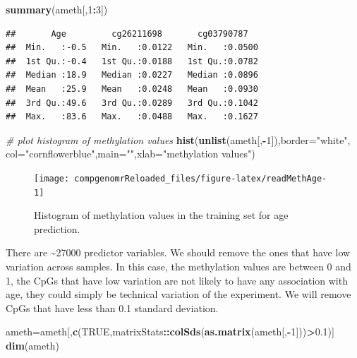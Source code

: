 \documentclass[12pt,]{krantz}
\newenvironment{Shaded}{\begin{snugshade}}{\end{snugshade}}
\newcommand{\CommentTok}[1]{\textcolor[rgb]{0.56,0.35,0.01}{\textit{#1}}}
\newcommand{\DataTypeTok}[1]{\textcolor[rgb]{0.13,0.29,0.53}{#1}}
\newcommand{\DecValTok}[1]{\textcolor[rgb]{0.00,0.00,0.81}{#1}}
\newcommand{\FloatTok}[1]{\textcolor[rgb]{0.00,0.00,0.81}{#1}}
\newcommand{\KeywordTok}[1]{\textcolor[rgb]{0.13,0.29,0.53}{\textbf{#1}}}
\newcommand{\NormalTok}[1]{#1}
\newcommand{\OperatorTok}[1]{\textcolor[rgb]{0.81,0.36,0.00}{\textbf{#1}}}
\newcommand{\OtherTok}[1]{\textcolor[rgb]{0.56,0.35,0.01}{#1}}
\newcommand{\StringTok}[1]{\textcolor[rgb]{0.31,0.60,0.02}{#1}}
\begin{document}
\begin{Shaded}
\begin{Highlighting}[]
\KeywordTok{summary}\NormalTok{(ameth[,}\DecValTok{1}\OperatorTok{:}\DecValTok{3}\NormalTok{])}
\end{Highlighting}
\end{Shaded}

\begin{verbatim}
##       Age         cg26211698       cg03790787    
##  Min.   :-0.5   Min.   :0.0122   Min.   :0.0500  
##  1st Qu.:-0.4   1st Qu.:0.0188   1st Qu.:0.0782  
##  Median :18.9   Median :0.0227   Median :0.0896  
##  Mean   :25.9   Mean   :0.0248   Mean   :0.0930  
##  3rd Qu.:49.6   3rd Qu.:0.0289   3rd Qu.:0.1042  
##  Max.   :83.6   Max.   :0.0488   Max.   :0.1627
\end{verbatim}

\begin{Shaded}
\begin{Highlighting}[]
\CommentTok{# plot histogram of methylation values}
\KeywordTok{hist}\NormalTok{(}\KeywordTok{unlist}\NormalTok{(ameth[,}\OperatorTok{-}\DecValTok{1}\NormalTok{]),}\DataTypeTok{border=}\StringTok{"white"}\NormalTok{,}
      \DataTypeTok{col=}\StringTok{"cornflowerblue"}\NormalTok{,}\DataTypeTok{main=}\StringTok{""}\NormalTok{,}\DataTypeTok{xlab=}\StringTok{"methylation values"}\NormalTok{)}
\end{Highlighting}
\end{Shaded}

\begin{figure}

{\centering \texttt{[image: compgenomrReloaded\_files/figure-latex/readMethAge-1]} 

}

\caption{Histogram of methylation values in the training set for age prediction.}\label{fig:readMethAge}
\end{figure}

There are \textasciitilde{}27000 predictor variables. We should remove the ones that have low variation across samples. In this case, the methylation values are between 0 and 1, the CpGs that have low variation are not likely to have any association with age, they could simply be technical variation of the experiment. We will remove CpGs that have less than 0.1 standard deviation.

\begin{Shaded}
\begin{Highlighting}[]
\NormalTok{ameth=ameth[,}\KeywordTok{c}\NormalTok{(}\OtherTok{TRUE}\NormalTok{,matrixStats}\OperatorTok{::}\KeywordTok{colSds}\NormalTok{(}\KeywordTok{as.matrix}\NormalTok{(ameth[,}\OperatorTok{-}\DecValTok{1}\NormalTok{]))}\OperatorTok{>}\FloatTok{0.1}\NormalTok{)]}
\KeywordTok{dim}\NormalTok{(ameth)}
\end{Highlighting}
\end{Shaded}
\end{document}
